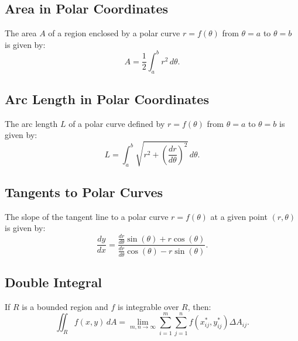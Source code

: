 \documentclass[a4paper,11pt]{article}
\begin{document}


\subsection{Area in Polar Coordinates}

\begin{tcolorbox}
    The area $A$ of a region enclosed by a polar curve $r=f(\theta)$ from $\theta=a$ to $\theta=b$ is given by:
    \[
    A=\frac{1}{2} \int_a^b r^2 \, d\theta.
    \]
\end{tcolorbox}




\subsection{Arc Length in Polar Coordinates}

\begin{tcolorbox}
    The arc length $L$ of a polar curve defined by $r=f(\theta)$ from $\theta=a$ to $\theta=b$ is given by:
    \[
    L = \int_a^b \sqrt{r^2 +\left( \frac{dr}{d\theta} \right)^2} \, d\theta.
    \]
\end{tcolorbox}




\subsection{Tangents to Polar Curves}

\begin{tcolorbox}
    The slope of the tangent line to a polar curve $r=f(\theta)$ at a given point $(r,\theta)$ is given by:
    \[
    \frac{dy}{dx} = \frac{\displaystyle \frac{dr}{d\theta} \sin{(\theta) + r \cos{(\theta)}}}{\displaystyle \frac{dr}{d\theta} \cos{(\theta) - r \sin{(\theta)}}}.
    \]
\end{tcolorbox}




\subsection{Double Integral}

\begin{tcolorbox}
    If $R$ is a bounded region and $f$ is integrable over $R$, then:
    \[
    \iint_R f(x,y) \, dA = \lim_{m,n \to \infty} \sum_{i=1}^m \sum_{j=1}^n f(x_{ij}^*,y_{ij}^*) \Delta A_{ij}.
    \]
\end{tcolorbox}
\end{document}
